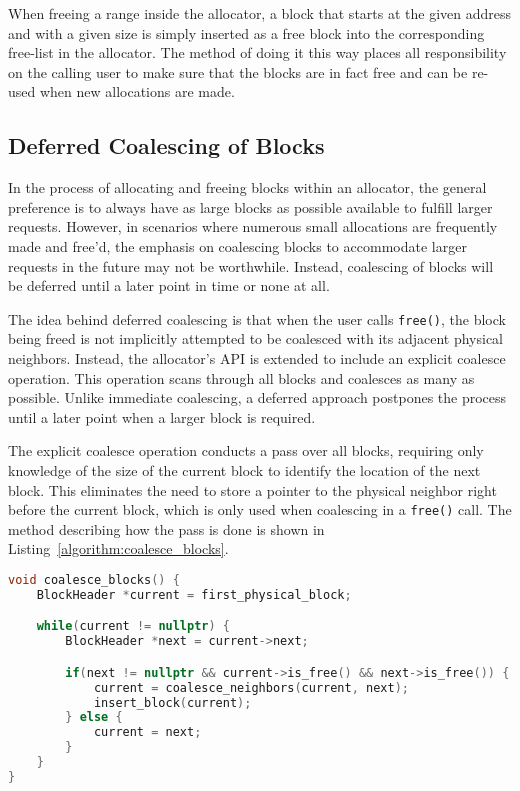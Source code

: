 When freeing a range inside the allocator, a block that starts at the given address and with a given size is simply inserted as a free block into the corresponding free-list in the allocator. The method of doing it this way places all responsibility on the calling user to make sure that the blocks are in fact free and can be re-used when new allocations are made.

\subsection{Deferred Coalescing of Blocks}

In the process of allocating and freeing blocks within an allocator, the general preference is to always have as large blocks as possible available to fulfill larger requests. However, in scenarios where numerous small allocations are frequently made and free'd, the emphasis on coalescing blocks to accommodate larger requests in the future may not be worthwhile. Instead, coalescing of blocks will be deferred until a later point in time or none at all.

The idea behind deferred coalescing is that when the user calls \texttt{free()}, the block being freed is not implicitly attempted to be coalesced with its adjacent physical neighbors. Instead, the allocator's API is extended to include an explicit coalesce operation. This operation scans through all blocks and coalesces as many as possible. Unlike immediate coalescing, a deferred approach postpones the process until a later point when a larger block is required.

The explicit coalesce operation conducts a pass over all blocks, requiring only knowledge of the size of the current block to identify the location of the next block. This eliminates the need to store a pointer to the physical neighbor right before the current block, which is only used when coalescing in a \texttt{free()} call. The method describing how the pass is done is shown in Listing~\ref{algorithm:coalesce_blocks}.

\begin{lstlisting}[language=C++, caption={Method for explicitly coalescing all possible free blocks in the allocator. Note that coalesce\_neighbors() removes both blocks from the free-list before the newly coalesced block is inserted.}, label={algorithm:coalesce_blocks}]
void coalesce_blocks() {
    BlockHeader *current = first_physical_block;

    while(current != nullptr) {
        BlockHeader *next = current->next;

        if(next != nullptr && current->is_free() && next->is_free()) {
            current = coalesce_neighbors(current, next);
            insert_block(current);
        } else {
            current = next;
        }
    }
}
\end{lstlisting}


